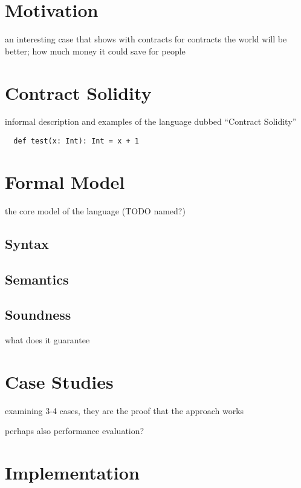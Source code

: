 \documentclass[acmsmall,review,anonymous]{acmart}\settopmatter{printfolios=true,printccs=false,printacmref=false}
\begin{document}
\section{Motivation}

an interesting case that shows with contracts for contracts the world will be better;
how much money it could save for people

\section{Contract Solidity}

informal description and examples of the language dubbed ``Contract Solidity''

\begin{lstlisting}
  def test(x: Int): Int = x + 1
\end{lstlisting}

\section{Formal Model}

the core model of the language (TODO named?)

\subsection{Syntax}

\subsection{Semantics}

\subsection{Soundness}

what does it guarantee

\section{Case Studies}

examining 3-4 cases, they are the proof that the approach works

perhaps also performance evaluation?

\section{Implementation}
\end{document}
